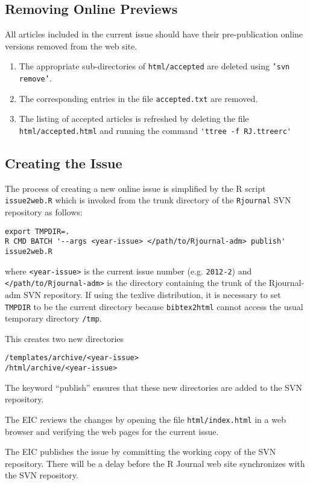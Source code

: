\documentclass[11pt]{article}
\begin{document}
\subsection{Removing Online Previews}

All articles included in the current issue should have their 
pre-publication online versions removed from the web site. 
\begin{enumerate}
\item The appropriate sub-directories of \texttt{html/accepted} are
  deleted using \texttt{'svn remove'}.
\item The corresponding entries in the file \texttt{accepted.txt} are 
  removed.
\item The listing of accepted articles is refreshed by deleting the
  file \texttt{html/accepted.html} and running the command
  \verb+'ttree -f RJ.ttreerc'+
\end{enumerate}

\subsection{Creating the Issue}

The process of creating a new online issue is simplified by the
R script \texttt{issue2web.R} which is invoked from the trunk
directory of the \texttt{Rjournal} SVN repository as follows:
{\small
\begin{verbatim}
export TMPDIR=. 
R CMD BATCH '--args <year-issue> </path/to/Rjournal-adm> publish' issue2web.R
\end{verbatim}
} where \verb+<year-issue>+ is the current issue number
(e.g. \texttt{2012-2}) and \verb+</path/to/Rjournal-adm>+ is the
directory containing the trunk of the Rjournal-adm SVN repository.  If
using the texlive distribution, it is necessary to set \texttt{TMPDIR}
to be the current directory because \texttt{bibtex2html} cannot access
the usual temporary directory \texttt{/tmp}.

This creates two new directories
\begin{verbatim}
/templates/archive/<year-issue>
/html/archive/<year-issue>
\end{verbatim}
The keyword ``publish'' ensures that these new directories are
added to the SVN repository.


The EIC reviews the changes by opening the file
\texttt{html/index.html} in a web browser and verifying the web
pages for the current issue.

The EIC publishes the issue by committing the working copy of the SVN
repository. There will be a delay before the R Journal web site
synchronizes with the SVN repository.
\end{document}
